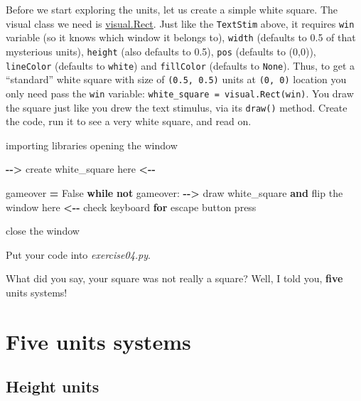 \documentclass[
]{book}
\newenvironment{Shaded}{\begin{snugshade}}{\end{snugshade}}
\newcommand{\ControlFlowTok}[1]{\textcolor[rgb]{0.13,0.29,0.53}{\textbf{#1}}}
\newcommand{\KeywordTok}[1]{\textcolor[rgb]{0.13,0.29,0.53}{\textbf{#1}}}
\newcommand{\NormalTok}[1]{#1}
\newcommand{\OperatorTok}[1]{\textcolor[rgb]{0.81,0.36,0.00}{\textbf{#1}}}
\newcommand{\VariableTok}[1]{\textcolor[rgb]{0.00,0.00,0.00}{#1}}
\begin{document}
Before we start exploring the units, let us create a simple white square. The visual class we need is \href{https://psychopy.org/api/visual/rect.html}{visual.Rect}. Just like the \texttt{TextStim} above, it requires \texttt{win} variable (so it knows which window it belongs to), \texttt{width} (defaults to 0.5 of that mysterious units), \texttt{height} (also defaults to 0.5), \texttt{pos} (defaults to (0,0)), \texttt{lineColor} (defaults to \texttt{white}) and \texttt{fillColor} (defaults to \texttt{None}). Thus, to get a ``standard'' white square with size of \texttt{(0.5,\ 0.5)} units at \texttt{(0,\ 0)} location you only need pass the \texttt{win} variable: \texttt{white\_square\ =\ visual.Rect(win)}. You draw the square just like you drew the text stimulus, via its \texttt{draw()} method. Create the code, run it to see a very white square, and read on.

\begin{Shaded}
\begin{Highlighting}[]
\NormalTok{importing libraries}
\NormalTok{opening the window}

\OperatorTok{{-}{-}\textgreater{}}\NormalTok{ create white\_square here }\OperatorTok{\textless{}{-}{-}}

\NormalTok{gameover }\OperatorTok{=} \VariableTok{False}
\ControlFlowTok{while} \KeywordTok{not}\NormalTok{ gameover:}
    \OperatorTok{{-}{-}\textgreater{}}\NormalTok{ draw white\_square }\KeywordTok{and}\NormalTok{ flip the window here }\OperatorTok{\textless{}{-}{-}}
\NormalTok{    check keyboard }\ControlFlowTok{for}\NormalTok{ escape button press}

\NormalTok{close the window}
\end{Highlighting}
\end{Shaded}

Put your code into \emph{exercise04.py}.

What did you say, your square was not really a square? Well, I told you, \textbf{five} units systems!

\hypertarget{psychopy-units}{%
\section{Five units systems}\label{psychopy-units}}

\hypertarget{height-units}{%
\subsection{Height units}\label{height-units}}
\end{document}

